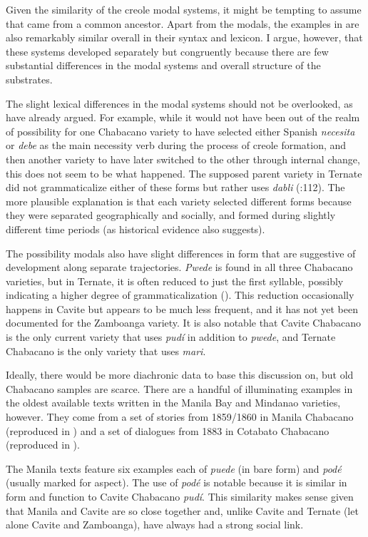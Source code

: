 \documentclass[output=paper]{langsci/langscibook}
\begin{document}
Given the similarity of the creole modal systems, it might be tempting to assume that came from a common ancestor. Apart from the modals, the examples in  are also remarkably similar overall in their syntax and lexicon. I argue, however, that these systems developed separately but congruently because there are few substantial differences in the modal systems and overall structure of the substrates. 

The slight lexical differences in the modal systems should not be overlooked, as \citet{SippolaLesho2020} have already argued. For example, while it would not have been out of the realm of possibility for one Chabacano variety to have selected either Spanish \textit{necesita} or \textit{debe} as the main necessity verb during the process of creole formation, and then another variety to have later switched to the other through internal change, this does not seem to be what happened. The supposed parent variety in Ternate did not grammaticalize either of these forms but rather uses \textit{dabli} (\citealt{SippolaLesho2020}:112). The more plausible explanation is that each variety selected different forms because they were separated geographically and socially, and formed during slightly different time periods (as historical evidence also suggests). 

The possibility modals also have slight differences in form that are suggestive of development along separate trajectories. \textit{Pwede} is found in all three Chabacano varieties, but in Ternate, it is often reduced to just the first syllable, possibly indicating a higher degree of grammaticalization (\citealt{SippolaLesho2020}). This reduction occasionally happens in Cavite but appears to be much less frequent, and it has not yet been documented for the Zamboanga variety. It is also notable that Cavite Chabacano is the only current variety that uses \textit{pudí} in addition to \textit{pwede}, and Ternate Chabacano is the only variety that uses \textit{mari}.

Ideally, there would be more diachronic data to base this discussion on, but old Chabacano samples are scarce. There are a handful of illuminating examples in the oldest available texts written in the Manila Bay and Mindanao varieties, however. They come from a set of stories from 1859/1860 in Manila Chabacano (reproduced in \citealt{FernándezSippola2017}) and a set of dialogues from 1883 in Cotabato Chabacano (reproduced in \citealt{Fernández2012b}). 

The Manila texts feature six examples each of \textit{puede} (in bare form) and \textit{podé} (usually marked for aspect). The use of \textit{podé} is notable because it is similar in form and function to Cavite Chabacano \textit{pudí}. This similarity makes sense given that Manila and Cavite are so close together and, unlike Cavite and Ternate (let alone Cavite and Zamboanga), have always had a strong social link. 
\end{document}
